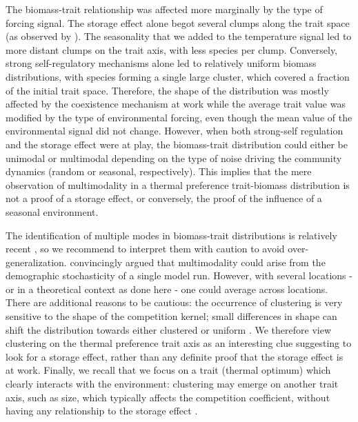 \documentclass[a4paper,12pt]{article}
\begin{document}
The biomass-trait relationship was affected more marginally by the
type of forcing signal. The storage effect alone begot several clumps
along the trait space (as observed by \citealp{scranton_coexistence_2016}).
The seasonality that we added to the temperature signal led to more
distant clumps on the trait axis, with less species per clump. Conversely,
strong self-regulatory mechanisms alone led to relatively uniform
biomass distributions, with species forming a single large cluster,
which covered a fraction of the initial trait space. Therefore, the
shape of the distribution was mostly affected by the coexistence mechanism
at work while the average trait value was modified by the type of
environmental forcing, even though the mean value of the environmental
signal did not change. However, when both strong-self regulation and
the storage effect were at play, the biomass-trait distribution could
either be unimodal or multimodal depending on the type of noise driving
the community dynamics (random or seasonal, respectively). This implies
that the mere observation of multimodality in a thermal preference
trait-biomass distribution is not a proof of a storage effect, or
conversely, the proof of the influence of a seasonal environment.

The identification of multiple modes in biomass-trait distributions
is relatively recent \citep{segura_competition_2013,loranger_what_2018,dandrea_translucent_2018,dandrea_generalizing_2019},
so we recommend to interpret them with caution to avoid over-generalization.
\citet{barabas_emergent_2013} convincingly argued that multimodality
could arise from the demographic stochasticity of a single model run.
However, with several locations - or in a theoretical context as done
here - one could average across locations. There are additional reasons
to be cautious: the occurrence of clustering is very sensitive to
the shape of the competition kernel; small differences in shape can
shift the distribution towards either clustered or uniform \citep{pigolotti_how_2010}.
We therefore view clustering on the thermal preference trait axis
as an interesting clue suggesting to look for a storage effect, rather
than any definite proof that the storage effect is at work. Finally,
we recall that we focus on a trait (thermal optimum) which clearly
interacts with the environment: clustering may emerge on another trait
axis, such as size, which typically affects the competition coefficient,
without having any relationship to the storage effect \citep{segura_emergent_2011,segura_competition_2013,dandrea_translucent_2018,dandrea_generalizing_2019}.
\end{document}
